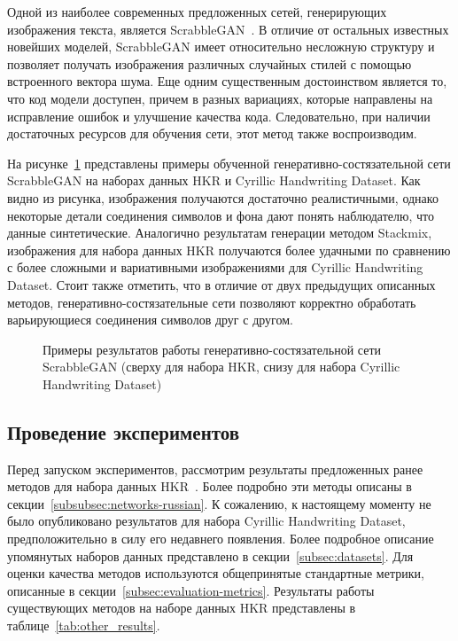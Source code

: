 Одной из наиболее современных предложенных сетей, генерирующих изображения текста, является ScrabbleGAN~\cite{fogel2020scrabblegan}.
В отличие от остальных известных новейших моделей, ScrabbleGAN имеет относительно несложную структуру и позволяет получать
изображения различных случайных стилей с помощью встроенного вектора шума.
Еще одним существенным достоинством является то, что код модели доступен, причем в разных вариациях,
которые направлены на исправление ошибок и улучшение качества кода.
Следовательно, при наличии достаточных ресурсов для обучения сети, этот метод также воспроизводим.

На рисунке~\ref{fig:gan_example} представлены примеры обученной генеративно-состязательной сети ScrabbleGAN на
наборах данных HKR и Cyrillic Handwriting Dataset.
Как видно из рисунка, изображения получаются достаточно реалистичными, однако некоторые детали соединения символов и фона
дают понять наблюдателю, что данные синтетические.
Аналогично результатам генерации методом Stackmix, изображения для набора данных HKR получаются более удачными по сравнению с
более сложными и вариативными изображениями для Cyrillic Handwriting Dataset.
Стоит также отметить, что в отличие от двух предыдущих описанных методов, генеративно-состязательные сети позволяют
корректно обработать варьирующиеся соединения символов друг с другом.

\begin{figure}[h!]
    \centering
    \caption{Примеры результатов работы генеративно-состязательной сети ScrabbleGAN (сверху для набора HKR, снизу для набора Cyrillic Handwriting Dataset)}
    \label{fig:gan_example}
\end{figure}


\subsection{Проведение экспериментов}
\label{subsec:experiments}

Перед запуском экспериментов, рассмотрим результаты предложенных ранее методов для набора данных HKR~\cite{nurseitov2021handwritten}.
Более подробно эти методы описаны в секции~\ref{subsubsec:networks-russian}.
К сожалению, к настоящему моменту не было опубликовано результатов для набора Cyrillic Handwriting Dataset, предположительно в силу его недавнего появления.
Более подробное описание упомянутых наборов данных представлено в секции~\ref{subsec:datasets}.
Для оценки качества методов используются общепринятые стандартные метрики, описанные в секции~\ref{subsec:evaluation-metrics}.
Результаты работы существующих методов на наборе данных HKR представлены в таблице~\ref{tab:other_results}.

